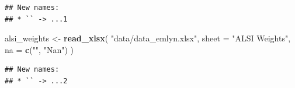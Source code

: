 \documentclass[
]{article}
\newenvironment{Shaded}{\begin{snugshade}}{\end{snugshade}}
\newcommand{\DataTypeTok}[1]{\textcolor[rgb]{0.13,0.29,0.53}{#1}}
\newcommand{\KeywordTok}[1]{\textcolor[rgb]{0.13,0.29,0.53}{\textbf{#1}}}
\newcommand{\NormalTok}[1]{#1}
\newcommand{\StringTok}[1]{\textcolor[rgb]{0.31,0.60,0.02}{#1}}
\begin{document}
\begin{verbatim}
## New names:
## * `` -> ...1
\end{verbatim}

\begin{Shaded}
\begin{Highlighting}[]
\NormalTok{alsi\_weights \textless{}{-}}\StringTok{ }\KeywordTok{read\_xlsx}\NormalTok{(}
  \StringTok{"data/data\_emlyn.xlsx"}\NormalTok{,}
  \DataTypeTok{sheet =} \StringTok{"ALSI Weights"}\NormalTok{,}
  \DataTypeTok{na =} \KeywordTok{c}\NormalTok{(}\StringTok{""}\NormalTok{, }\StringTok{"Nan"}\NormalTok{)}
\NormalTok{)}
\end{Highlighting}
\end{Shaded}

\begin{verbatim}
## New names:
## * `` -> ...2
\end{verbatim}
\end{document}
